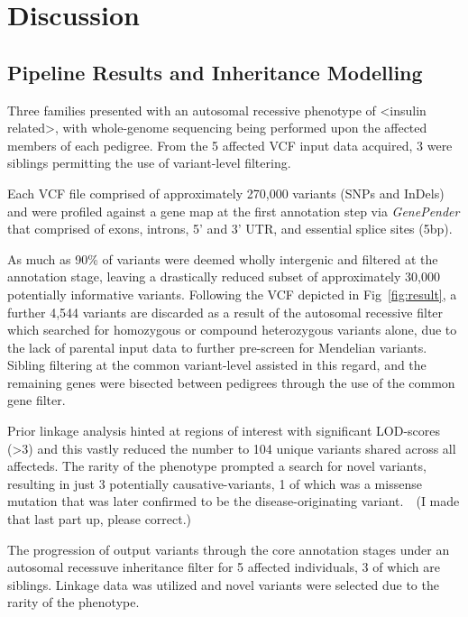 \section{Discussion}

\subsection{Pipeline Results and Inheritance Modelling}

Three families presented with an autosomal recessive phenotype of <insulin related>, with whole-genome sequencing being performed upon the affected members of each pedigree. From the 5 affected VCF input data acquired, 3 were siblings permitting the use of variant-level filtering.

Each VCF file comprised of approximately 270,000 variants (SNPs and InDels) and were profiled against a gene map at the first annotation step via \textit{GenePender} that comprised of exons, introns, 5' and 3' UTR, and essential splice sites (5bp).

As much as 90\% of variants were deemed wholly intergenic and filtered at the annotation stage, leaving a drastically reduced subset of approximately 30,000 potentially informative variants. Following the VCF depicted in Fig~\ref{fig:result}, a further 4,544 variants are discarded as a result of the autosomal recessive filter which searched for homozygous or compound heterozygous variants alone, due to the lack of parental input data to further pre-screen for Mendelian variants. Sibling filtering at the common variant-level assisted in this regard, and the remaining genes were bisected between pedigrees through the use of the common gene filter.

Prior linkage analysis hinted at regions of interest with significant LOD-scores (>3) and this vastly reduced the number to 104 unique variants shared across all affecteds. The rarity of the phenotype prompted a search for novel variants, resulting in just 3 potentially causative-variants, 1 of which was a missense mutation that was later confirmed to be the disease-originating variant.\
\
(I made that last part up, please correct.)


{The progression of output variants through the core annotation stages under an autosomal recessuve inheritance filter for 5 affected individuals, 3 of which are siblings. Linkage data was utilized and novel variants were selected due to the rarity of the phenotype.}


